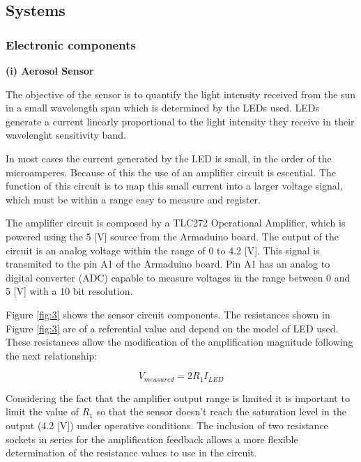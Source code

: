 \documentclass[12pt,letterpaper]{article}
\numberwithin{figure}{section}
\numberwithin{equation}{section}
\numberwithin{table}{section}
\begin{document}

\subsection{Systems}

\subsubsection{Electronic components}
 \label{componentes_electronicos}
 
\begin{flushleft}
\textbf{(i) Aerosol Sensor}
\end{flushleft}

The objective of the sensor is to quantify the light intensity received from the sun in a small wavelength span which is determined by the LEDs used. LEDs generate a current linearly proportional to the light intensity they receive in their wavelenght sensitivity band.

In most cases the current generated by the LED is small, in the order of the microamperes. Because of this the use of an amplifier circuit is escential. The function of this circuit is to map this small current into a larger voltage signal, which must be within a range easy to measure and register.

The amplifier circuit is composed by a TLC272 Operational Amplifier, which is powered using the 5 [V] source from the Armaduino board. The output of the circuit is an analog voltage within the range of 0 to 4.2 [V]. This signal is transmited to the pin A1 of the Armaduino board. Pin A1 has an analog to digital converter (ADC) capable to measure voltages in the range between 0 and 5 [V] with a 10 bit resolution.

Figure \ref{fig:3} shows the sensor circuit components. The resistances shown in Figure \ref{fig:3} are of a referential value and depend on the model of LED used. These resistances allow the modification of the amplification magnitude following the next relationship:

\begin{equation}
    V_{measured} = 2R_1I_{LED}
    \label{eq:5}
\end{equation}

Considering the fact that the amplifier output range is limited it is important to limit the value of $R_1$ so that the sensor doesn't reach the saturation level in the output (4.2 [V]) under operative conditions. The inclusion of two resistance sockets in series for the amplification feedback allows a more flexible determination of the resistance values to use in the circuit. 
\end{document}
